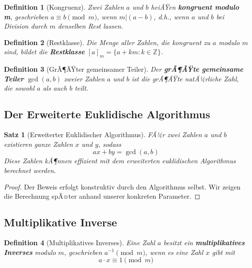 ﻿\documentclass[12pt,a4paper]{article}
\newtheorem{theorem}{Satz}
\newtheorem{definition}{Definition}
\begin{document}
	\begin{definition}[Kongruenz]
		Zwei Zahlen $a$ und $b$ heiÃŸen \textbf{kongruent modulo m}, geschrieben $a \equiv b \pmod{m}$, wenn $m | (a-b)$, d.h., wenn $a$ und $b$ bei Division durch $m$ denselben Rest lassen.
	\end{definition}
	
	\begin{definition}[Restklasse]
		Die Menge aller Zahlen, die kongruent zu $a$ modulo $m$ sind, bildet die \textbf{Restklasse} $[a]_m = \{a + km : k \in \mathbb{Z}\}$.
	\end{definition}
	
	\begin{definition}[GrÃ¶ÃŸter gemeinsamer Teiler]
		Der \textbf{grÃ¶ÃŸte gemeinsame Teiler} $\gcd(a,b)$ zweier Zahlen $a$ und $b$ ist die grÃ¶ÃŸte natÃ¼rliche Zahl, die sowohl $a$ als auch $b$ teilt.
	\end{definition}
	
	\subsection{Der Erweiterte Euklidische Algorithmus}
	
	\begin{theorem}[Erweiterter Euklidischer Algorithmus]
		FÃ¼r zwei Zahlen $a$ und $b$ existieren ganze Zahlen $x$ und $y$, sodass
		\begin{equation}
			ax + by = \gcd(a,b)
		\end{equation}
		Diese Zahlen kÃ¶nnen effizient mit dem erweiterten euklidischen Algorithmus berechnet werden.
	\end{theorem}
	
	\begin{proof}
		Der Beweis erfolgt konstruktiv durch den Algorithmus selbst. Wir zeigen die Berechnung spÃ¤ter anhand unserer konkreten Parameter.
	\end{proof}
	
	\subsection{Multiplikative Inverse}
	
	\begin{definition}[Multiplikatives Inverses]
		Eine Zahl $a$ besitzt ein \textbf{multiplikatives Inverses} modulo $m$, geschrieben $a^{-1} \pmod{m}$, wenn es eine Zahl $x$ gibt mit
		\begin{equation}
			a \cdot x \equiv 1 \pmod{m}
		\end{equation}
	\end{definition}
	
\end{document}
